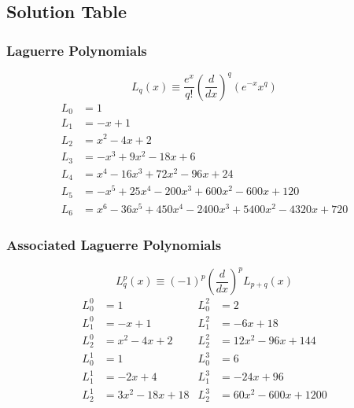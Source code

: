 \subsection{Solution Table}

\subsubsection{Laguerre Polynomials}
\noindent\begin{equation*}
    L_q(x)\equiv\frac{e^x}{q!}{\left(\frac d{dx}\right)}^q\left(e^{-x}x^q\right)
\end{equation*}
\noindent\begin{align*}
    L_{0} & =1                                          \\
    L_{1} & =-x+1                                       \\
    L_{2} & =x^2-4x+2                                   \\
    L_{3} & =-x^3+9x^2-18x+6                            \\
    L_{4} & =x^4-16x^3+72x^2-96x+24                     \\
    L_{5} & =-x^5+25x^4-200x^3+600x^2-600x+120          \\
    L_{6} & =x^6-36x^5+450x^4-2400x^3+5400x^2-4320x+720
\end{align*}

\subsubsection{Associated Laguerre Polynomials}
\noindent\begin{equation*}
    L_{q}^{p}(x)\equiv{(-1)}^{p}{\left(\frac{d}{dx}\right)}^{p}L_{p+q}(x)
\end{equation*}
\noindent\begin{align*}
    L_0^0 & =1           & L_{0}^{2} & =2               \\
    L_1^0 & =-x+1        & L_1^2     & =-6x+18          \\
    L_2^0 & =x^2-4x+2    & L_2^2     & =12x^2-96x+144   \\
    L_0^1 & =1           & L_0^3     & =6               \\
    L_1^1 & =-2x+4       & L_1^3     & =-24x+96         \\
    L_2^1 & =3x^2-18x+18 & L_2^3     & =60x^2-600x+1200
\end{align*}

